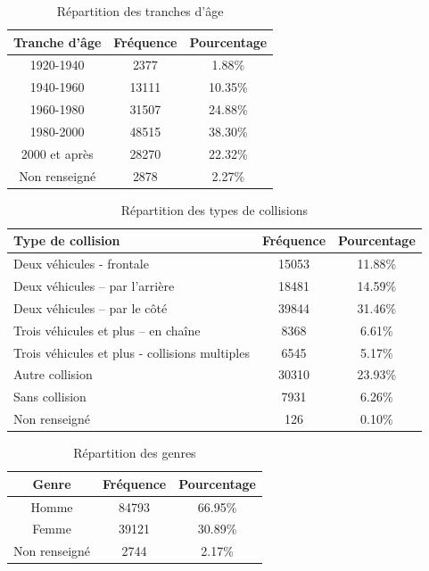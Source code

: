 \documentclass[french]{article}
\begin{document}
\begin{table}[h]
\centering
\begin{tabular}{|c|c|c|}
\hline
\textbf{Tranche d'âge} & \textbf{Fréquence} & \textbf{Pourcentage} \\
\hline
1920-1940 & 2377 & 1.88\% \\
1940-1960 & 13111 & 10.35\% \\
1960-1980 & 31507 & 24.88\% \\
1980-2000 & 48515 & 38.30\% \\
2000 et après & 28270 & 22.32\% \\
Non renseigné & 2878 & 2.27\% \\
\hline
\end{tabular}
\caption{Répartition des tranches d'âge}
\end{table}
\begin{table}[h]
\centering
\begin{tabular}{|p{6cm}|c|c|}
\hline
\textbf{Type de collision} & \textbf{Fréquence} & \textbf{Pourcentage} \\
\hline
Deux véhicules - frontale & 15053 & 11.88\% \\
Deux véhicules – par l’arrière & 18481 & 14.59\% \\
Deux véhicules – par le côté & 39844 & 31.46\% \\
Trois véhicules et plus – en chaîne & 8368 & 6.61\% \\
Trois véhicules et plus - collisions multiples & 6545 & 5.17\% \\
Autre collision & 30310 & 23.93\% \\
Sans collision & 7931 & 6.26\% \\
Non renseigné & 126 & 0.10\% \\
\hline
\end{tabular}
\caption{Répartition des types de collisions}
\end{table}

\begin{table}[h]
\centering
\begin{tabular}{|c|c|c|}
\hline
\textbf{Genre} & \textbf{Fréquence} & \textbf{Pourcentage} \\
\hline
Homme & 84793 & 66.95\% \\
Femme & 39121 & 30.89\% \\
Non renseigné & 2744 & 2.17\% \\
\hline
\end{tabular}
\caption{Répartition des genres}
\end{table}
\end{document}
